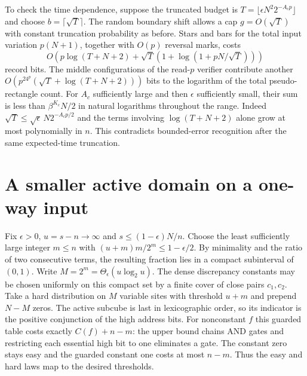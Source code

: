 \documentclass[11pt]{article}
\begin{document}
To check the time dependence, suppose the truncated budget is
$T=\lfloor\epsilon N^2 2^{-A_c p}\rfloor$ and choose $b=\lceil\sqrt T\rceil$.
The random boundary shift allows a cap $g=O(\sqrt T)$ with constant
truncation probability as before. Stars and bars for the total input
variation $p(N+1)$, together with $O(p)$ reversal marks, costs
\[
 O\left(p\log(T+N+2)+\sqrt T
       \left(1+\log(1+pN/\sqrt T)\right)\right)
\]
record bits. The middle configurations of the read-$p$ verifier
contribute another $O(p^24^p(\sqrt T+\log(T+N+2)))$ bits to the logarithm
of the total pseudo-rectangle count. For $A_c$ sufficiently large and
then $\epsilon$ sufficiently small, their sum is less than
$\beta^{K_c}N/2$ in natural logarithms throughout the range.
Indeed $\sqrt T\le\sqrt\epsilon\,N2^{-A_cp/2}$ and the terms involving
$\log(T+N+2)$ alone grow at most polynomially in $n$. This contradicts
bounded-error recognition after the same expected-time truncation.

\section{A smaller active domain on a one-way input}
Fix $\epsilon>0$, $u=s-n\to\infty$ and $s\le(1-\epsilon)N/n$. Choose the least sufficiently large integer $m\le n$ with $(u+m)m/2^m\le1-\epsilon/2$. By minimality and the ratio of two consecutive terms, the resulting fraction lies in a compact subinterval of $(0,1)$. Write $M=2^m=\Theta_\epsilon(u\log_2 u)$. The dense discrepancy constants may be chosen uniformly on this compact set by a finite cover of close pairs $c_1,c_2$. Take a hard distribution on $M$ variable sites with threshold $u+m$ and prepend $N-M$ zeros. The active subcube is last in lexicographic order, so its indicator is the positive conjunction of the high address bits. For nonconstant $f$ this guarded table costs exactly $C(f)+n-m$: the upper bound chains AND gates and restricting each essential high bit to one eliminates a gate. The constant zero stays easy and the guarded constant one costs at most $n-m$. Thus the easy and hard laws map to the desired thresholds.
\end{document}
